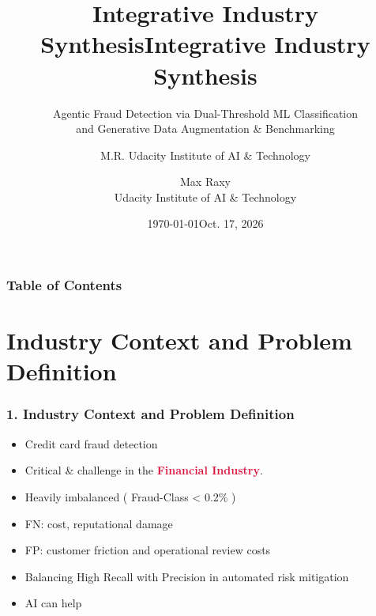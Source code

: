 \documentclass[xcolor={dvipsnames,svgnames,table}]{beamer}
\title{Integrative Industry Synthesis}
\author{M.R.  Udacity Institute of AI \& Technology}
\date{\today}
\title[Integrative Industry Synthesis] %
{Integrative Industry Synthesis}
\subtitle{Agentic Fraud Detection via Dual-Threshold ML Classification\\and Generative Data Augmentation \& Benchmarking}
\author[M.R.  Udacity Institute of AI \& Technology] %
{Max Raxy\\ Udacity Institute of AI \& Technology
}
\date[Oct. 2026] %
{Oct. 17, 2026}
\begin{document}
	
	\frame{\titlepage}


\begin{frame}
	\frametitle{Table of Contents}
	\tableofcontents
\end{frame}

\section{Industry Context and Problem Definition}
\begin{frame}
	\frametitle{1. Industry Context and Problem Definition}
\begin{itemize}
	\item Credit card fraud detection
	\item Critical \& challenge in the \textcolor{Crimson}{\textbf{Financial Industry}}.
	\item Heavily imbalanced ( Fraud-Class < 0.2\% )
	\item FN: cost, reputational damage
	\item FP: customer friction and operational review costs
	\item Balancing High Recall with Precision in automated risk mitigation
	\item AI can help
\end{itemize} 
%
%
\end{frame}
\end{document}
